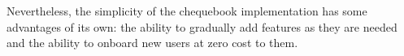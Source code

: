Nevertheless, the simplicity of the chequebook implementation has some advantages of its own: the ability to gradually add features as they are needed and the ability to onboard new users at zero cost to them.


% 
% 
% 
% 
% 
